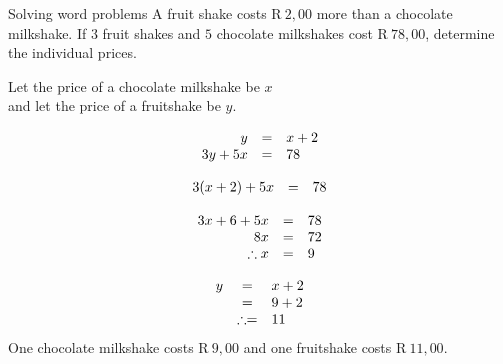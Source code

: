 \begin{wex}
{Solving word problems}
{
A fruit shake costs R$~2,00$ more than a chocolate milkshake. If $3$ fruit shakes and $5$ chocolate milkshakes cost R$~78,00$, determine the individual prices.}

{
Let the price of a chocolate milkshake be $x$ 
\\ and let the price of a fruitshake be $y$.


\begin{equation*}
\begin{array}{ccl} \hfill y &=& x+2 \hfill \\
\hfill 3y+5x& =& 78\hfill 
\end{array}
\end{equation*}

\begin{equation*}
\begin{array}{ccl}\hfill 3(x+2)+5x& =& 78\hfill \\
\end{array}
\end{equation*}

\begin{equation*}
\begin{array}{ccl}
 \hfill 3x+6+5x& =& 78\hfill \\ 
\hfill 8x& =& 72\hfill \\ 
\hfill \therefore x& =& 9\hfill \\  \end{array}
\end{equation*}

\begin{equation*}
\begin{array}{ccl}
\hfill y& =& x+2\hfill \\
 \hfill & =& 9+2\hfill \\ 
\hfill & \therefore =& 11\hfill  \end{array}
\end{equation*}
One chocolate milkshake costs R$~9,00$ and one fruitshake costs R$~ 11,00$.
}
\end{wex}

